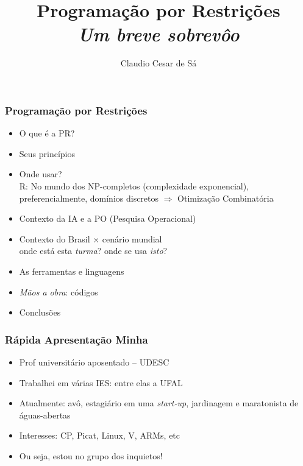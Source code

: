 \documentclass{beamer}
\title[Combinatorial  Optimization] %
{Programação por Restrições \\ \textit{Um breve sobrevôo}}
\author[Claudio Cesar de Sá] 
{Claudio Cesar de Sá}%
\institute[WhatsTV]{Independent Researcher and WhatsTV Inc.}
\date[\today] %
\begin{document}
\begin{frame}
  \titlepage
  
\end{frame}

\begin{frame}[fragile]

\frametitle{Programação por Restrições}

    \begin{itemize}
        \item O que é a PR?
        \item Seus princípios
        \item Onde usar? \\
        R: No mundo dos NP-completos (complexidade exponencial), preferencialmente, domínios discretos $\Rightarrow$ Otimização Combinatória
        \item Contexto da IA e a PO (Pesquisa Operacional)
        \item Contexto do Brasil $\times $ cenário mundial\\ 
        onde está esta {\em turma}? onde se usa {\em isto}?
        \item As ferramentas e linguagens
        \item {\em Mãos a obra}: códigos
        \item Conclusões 
    \end{itemize}

\end{frame}

 \begin{frame}[fragile]

\frametitle{Rápida Apresentação Minha}
\begin{itemize}
    \item Prof universitário aposentado -- UDESC
    \item Trabalhei em várias IES: entre elas a UFAL
    \item Atualmente: avô, estagiário em uma {\em start-up}, jardinagem e maratonista de águas-abertas 
    \item Interesses: CP, Picat, Linux, V, ARMs, etc
    \pause
    \item Ou seja, estou no grupo dos inquietos!
\end{itemize}

\end{frame}
\end{document}
